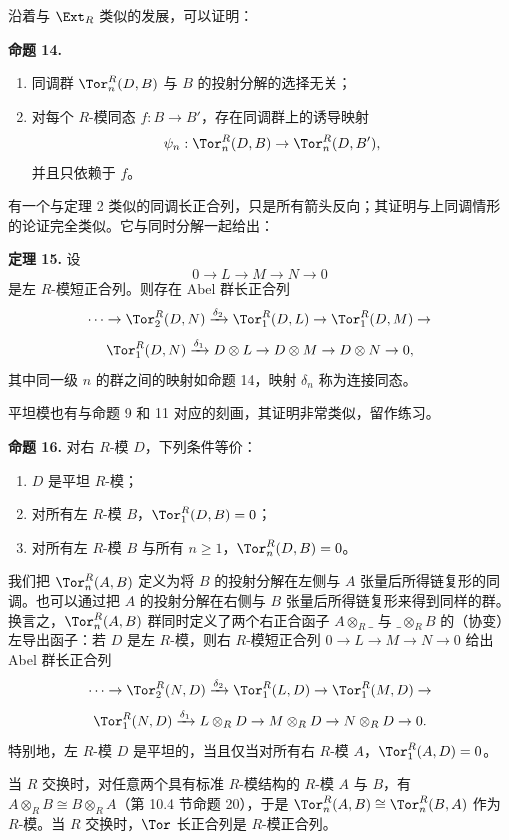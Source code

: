 沿着与 $\Ext_R$ 类似的发展，可以证明：

\medskip
\noindent\textbf{命题 14.}
\begin{enumerate}[label=(\arabic*)]
  \item 同调群 $\Tor_n^R(D,B)$ 与 $B$ 的投射分解的选择无关；
  \item 对每个 $R$-模同态 $f:B\to B'$，存在同调群上的诱导映射
  \[
    \psi_n:\Tor_n^R(D,B)\to\Tor_n^R(D,B'),
  \]
  并且只依赖于 $f$。
\end{enumerate}

有一个与定理 2 类似的同调长正合列，只是所有箭头反向；其证明与上同调情形的论证完全类似。它与同时分解一起给出：

\medskip
\noindent\textbf{定理 15.} 设
\[
  0\to L\to M\to N\to0
\]
是左 $R$-模短正合列。则存在 Abel 群长正合列
\[
  \cdots\to\Tor_2^R(D,N)\xrightarrow{\delta_2}\Tor_1^R(D,L)\to\Tor_1^R(D,M)\to
\]
\[
  \Tor_1^R(D,N)\xrightarrow{\delta_1}D\otimes L\to D\otimes M\to D\otimes N\to0,
\]
其中同一级 $n$ 的群之间的映射如命题 14，映射 $\delta_n$ 称为连接同态。

平坦模也有与命题 9 和 11 对应的刻画，其证明非常类似，留作练习。

\medskip
\noindent\textbf{命题 16.} 对右 $R$-模 $D$，下列条件等价：
\begin{enumerate}[label=(\arabic*)]
  \item $D$ 是平坦 $R$-模；
  \item 对所有左 $R$-模 $B$，$\Tor_1^R(D,B)=0$；
  \item 对所有左 $R$-模 $B$ 与所有 $n\geq1$，$\Tor_n^R(D,B)=0$。
\end{enumerate}

我们把 $\Tor_n^R(A,B)$ 定义为将 $B$ 的投射分解在左侧与 $A$ 张量后所得链复形的同调。也可以通过把 $A$ 的投射分解在右侧与 $B$ 张量后所得链复形来得到同样的群。换言之，$\Tor_n^R(A,B)$ 群同时定义了两个右正合函子 $A\otimes_R\_$ 与 $\_\otimes_R B$ 的（协变）左导出函子：若 $D$ 是左 $R$-模，则右 $R$-模短正合列 $0\to L\to M\to N\to0$ 给出 Abel 群长正合列
\[
  \cdots\to\Tor_2^R(N,D)\xrightarrow{\delta_2}\Tor_1^R(L,D)\to\Tor_1^R(M,D)\to
\]
\[
  \Tor_1^R(N,D)\xrightarrow{\delta_1}L\otimes_R D\to M\otimes_R D\to N\otimes_R D\to0.
\]
特别地，左 $R$-模 $D$ 是平坦的，当且仅当对所有右 $R$-模 $A$，$\Tor_1^R(A,D)=0$。

当 $R$ 交换时，对任意两个具有标准 $R$-模结构的 $R$-模 $A$ 与 $B$，有 $A\otimes_RB\cong B\otimes_RA$（第 10.4 节命题 20），于是 $\Tor_n^R(A,B)\cong\Tor_n^R(B,A)$ 作为 $R$-模。当 $R$ 交换时，$\Tor$ 长正合列是 $R$-模正合列。


